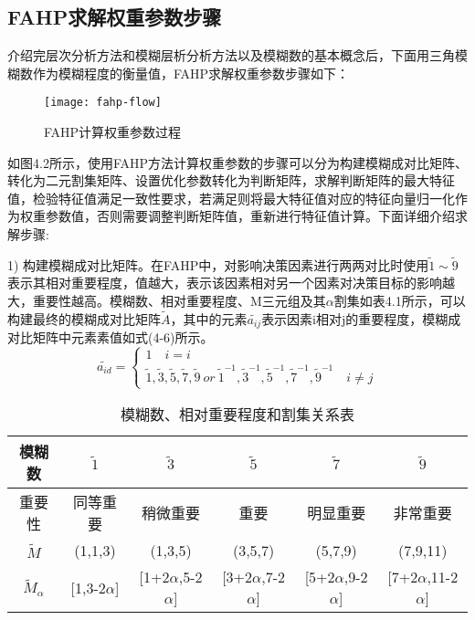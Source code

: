 \subsection{FAHP求解权重参数步骤}
介绍完层次分析方法和模糊层析分析方法以及模糊数的基本概念后，下面用三角模糊数作为模糊程度的衡量值，FAHP求解权重参数步骤如下：
\begin{figure}[H] %
	\centering
	\texttt{[image: fahp-flow]}
	\caption{FAHP计算权重参数过程}
	\label{fig:xfig1}
\end{figure}
如图4.2所示，使用FAHP方法计算权重参数的步骤可以分为构建模糊成对比矩阵、转化为二元割集矩阵、设置优化参数转化为判断矩阵，求解判断矩阵的最大特征值，检验特征值满足一致性要求，若满足则将最大特征值对应的特征向量归一化作为权重参数值，否则需要调整判断矩阵值，重新进行特征值计算。下面详细介绍求解步骤:

1) 构建模糊成对比矩阵。在FAHP中，对影响决策因素进行两两对比时使用\begin{math}\widetilde{1}\sim \widetilde{9}\end{math}表示其相对重要程度，值越大，表示该因素相对另一个因素对决策目标的影响越大，重要性越高。模糊数、相对重要程度、M三元组及其\begin{math}\alpha \end{math}割集如表4.1所示，可以构建最终的模糊成对比矩阵\begin{math}\widetilde{A} \end{math}，其中的元素\begin{math}\widetilde{a_{ij}} \end{math}表示因素i相对j的重要程度，模糊成对比矩阵中元素素值如式(4-6)所示。
\begin{equation}
\widetilde{a_{id}} = \left\{\begin{array}{l}
1 \quad i=i \\ [0.2cm]
\widetilde{1},\widetilde{3},\widetilde{5},\widetilde{7},\widetilde{9}\ or\ \widetilde{1}^{-1},\widetilde{3}^{-1},\widetilde{5}^{-1},\widetilde{7}^{-1},\widetilde{9}^{-1} \quad i\not=j  
\end{array}\right.
\end{equation}
\begin{table}[htbp]
	\centering\dawu[1.3]
	\caption{模糊数、相对重要程度和割集关系表}
	\begin{tabular}{|c|c|c|c|c|c|} \hline
		模糊数 & $\widetilde{1}$ & $\widetilde{3}$ & $\widetilde{5}$  & $\widetilde{7}$ & $\widetilde{9}$ \\ \hline
		重要性 & 同等重要 & 稍微重要 & 重要 & 明显重要 & 非常重要 \\ \hline 
		$\widetilde{M}$ & (1,1,3) & (1,3,5) & (3,5,7) & (5,7,9) & (7,9,11) \\ \hline 
		$\widetilde{M}_{\alpha}$ & [1,3-2$\alpha$] & [1+2$\alpha$,5-2$\alpha$] & [3+2$\alpha$,7-2$\alpha$] & [5+2$\alpha$,9-2$\alpha$] & [7+2$\alpha$,11-2$\alpha$]\\ \hline 
	\end{tabular}
\end{table}

